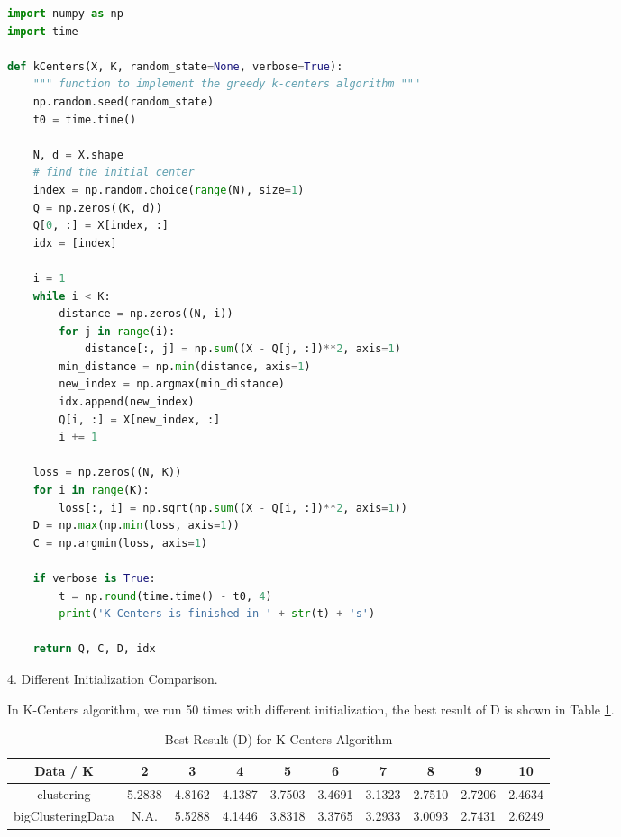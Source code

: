 \begin{description}
\begin{description}
\begin{lstlisting}[language=Python, caption=K-Centers Algorithm Python Code]
import numpy as np
import time

def kCenters(X, K, random_state=None, verbose=True):
    """ function to implement the greedy k-centers algorithm """
    np.random.seed(random_state)
    t0 = time.time()

    N, d = X.shape
    # find the initial center
    index = np.random.choice(range(N), size=1)
    Q = np.zeros((K, d))
    Q[0, :] = X[index, :]
    idx = [index]

    i = 1
    while i < K:
        distance = np.zeros((N, i))
        for j in range(i):
            distance[:, j] = np.sum((X - Q[j, :])**2, axis=1)
        min_distance = np.min(distance, axis=1)
        new_index = np.argmax(min_distance)
        idx.append(new_index)
        Q[i, :] = X[new_index, :]
        i += 1

    loss = np.zeros((N, K))
    for i in range(K):
        loss[:, i] = np.sqrt(np.sum((X - Q[i, :])**2, axis=1))
    D = np.max(np.min(loss, axis=1))
    C = np.argmin(loss, axis=1)

    if verbose is True:
        t = np.round(time.time() - t0, 4)
        print('K-Centers is finished in ' + str(t) + 's')

    return Q, C, D, idx
\end{lstlisting}

\item{4.} Different Initialization Comparison.

In K-Centers algorithm, we run 50 times with different initialization, the best result of D is shown in Table \ref{table:best_kcenter}.

\begin{table}[H]
	\centering
	\caption{Best Result (D) for K-Centers Algorithm}
	\label{table:best_kcenter}	
	\begin{tabular}{ c | c | c | c | c | c | c | c | c | c}
		\hline \hline
		Data / K      & 2     &    3    & 4    & 5     & 6    & 7    & 8   & 9    & 10 \\[0.1cm]
		\hline
	clustering	        & 5.2838 &    4.8162 & 4.1387 & 3.7503 & 3.4691 & 3.1323 & 2.7510 & 2.7206 & 2.4634 \\[0.1cm]
bigClusteringData & N.A. &    5.5288 & 4.1446 & 3.8318 & 3.3765 & 3.2933 & 3.0093 & 2.7431 & 2.6249 \\[0.1cm]
		\hline	
	\end{tabular}
\end{table}


\end{description}
\end{description}
